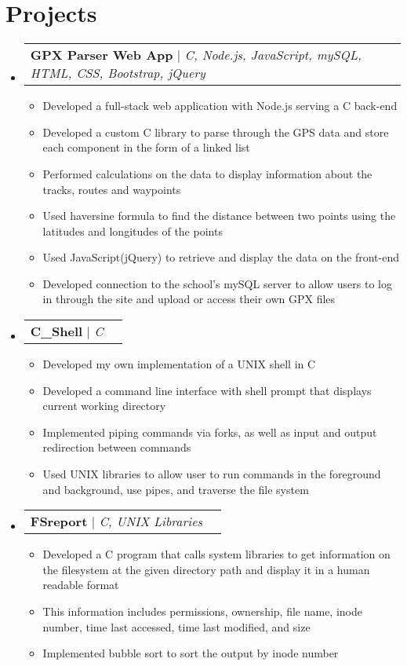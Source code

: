 \documentclass[letterpaper,11pt]{article}
\makeatletter
\newcommand{\resumeItem}[1]{
  \item\small{
    {#1 \vspace{-2pt}}
  }
}
\newcommand{\resumeProjectHeading}[2]{
    \item
    \begin{tabular*}{0.97\textwidth}{l@{\extracolsep{\fill}}r}
      \small#1 & #2 \\
    \end{tabular*}\vspace{-7pt}
}
\newcommand{\resumeSubHeadingListStart}{\begin{itemize}[leftmargin=0.15in, label={}]}
\newcommand{\resumeSubHeadingListEnd}{\end{itemize}}
\newcommand{\resumeItemListStart}{\begin{itemize}}
\newcommand{\resumeItemListEnd}{\end{itemize}\vspace{-5pt}}
\makeatother
\begin{document}
\section{Projects}
    \resumeSubHeadingListStart
      \resumeProjectHeading
          {\textbf{GPX Parser Web App} $|$ \emph{C, Node.js, JavaScript, mySQL, HTML, CSS, Bootstrap, jQuery}}{}
          \resumeItemListStart
            \resumeItem{Developed a full-stack web application with Node.js serving a C back-end}
            \resumeItem{Developed a custom C library to parse through the GPS data and store each component in the form of a linked list}
            \resumeItem{Performed calculations on the data to display information about the tracks, routes and waypoints}
            \resumeItem{Used haversine formula to find the distance between two points using the latitudes and longitudes of the points}
            \resumeItem{Used JavaScript(jQuery) to retrieve and display the data on the front-end}
            \resumeItem{Developed connection to the school's mySQL server to allow users to log in through the site and upload or access their own GPX files}
          \resumeItemListEnd
      \resumeProjectHeading
          {\textbf{C\_Shell} $|$ \emph{C}}{}
          \resumeItemListStart
            \resumeItem{Developed my own implementation of a UNIX shell in C}
            \resumeItem{Developed a command line interface with shell prompt that displays current working directory}
            \resumeItem{Implemented piping commands via forks, as well as input and output redirection between commands}
            \resumeItem{Used UNIX libraries to allow user to run commands in the foreground and background, use pipes, and traverse the file system}
          \resumeItemListEnd
      \resumeProjectHeading
          {\textbf{FSreport} $|$ \emph{C, UNIX Libraries}}{}
          \resumeItemListStart
            \resumeItem{Developed a C program that calls system libraries to get information on the filesystem at the given directory path and display it in a human readable format}
            \resumeItem{This information
includes permissions, ownership, file name, inode number, time last accessed, time last modified, and size}
            \resumeItem{Implemented bubble sort to sort the output by inode number}
          \resumeItemListEnd

    \resumeSubHeadingListEnd



%
\end{document}
